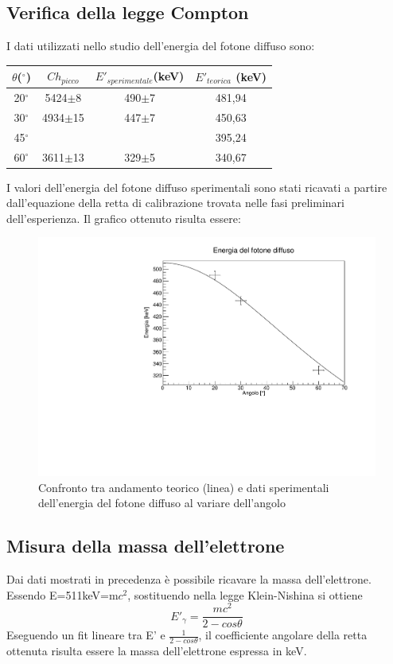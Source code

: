 \documentclass[italian,11pt]{report}
\begin{document}
\subsection{Verifica della legge Compton}
I dati utilizzati nello studio dell'energia del fotone diffuso sono:

\vspace{0,4cm}
\begin{center}
    \centering
    \begin{tabular}{cccc}
    \hline
    $\theta$($^\circ$)& $Ch_{picco}$ & $E'_{sperimentale}$(keV)& $E'_{teorica}$ (keV) \\
    \hline\hline
    20$^\circ$ & 5424$\pm$8 & 490$\pm$7 & 481,94\\
    30$^\circ$& 4934$\pm$15& 447$\pm$7& 450,63\\
    45$^\circ$& & & 395,24\\
    60$^\circ$& 3611$\pm$13& 329$\pm$5& 340,67\\
    \hline
    \end{tabular}
    \end{center}
\vspace{0,4cm}
I valori dell'energia del fotone diffuso sperimentali sono stati ricavati a partire dall'equazione della retta di calibrazione trovata nelle fasi preliminari dell'esperienza. \newline Il grafico ottenuto risulta essere:
\begin{figure}[!htp]
\centering
\includegraphics[width=12cm]{EnergiaFotone.pdf}
\caption{Confronto tra andamento teorico (linea) e dati sperimentali dell'energia del fotone diffuso al variare dell'angolo}
\end{figure}

\subsection{Misura della massa dell'elettrone}
Dai dati mostrati in precedenza è possibile ricavare la massa dell'elettrone. Essendo E=511keV=m$c^{2}$, sostituendo nella legge Klein-Nishina si ottiene 
\begin{equation}
E'_{\gamma}=\frac{mc^{2}}{2-cos\theta}
\end{equation}
Eseguendo un fit lineare tra E' e $\frac{1}{2-cos\theta}$, il coefficiente angolare della retta ottenuta risulta essere la massa dell'elettrone espressa in keV.
\end{document}

